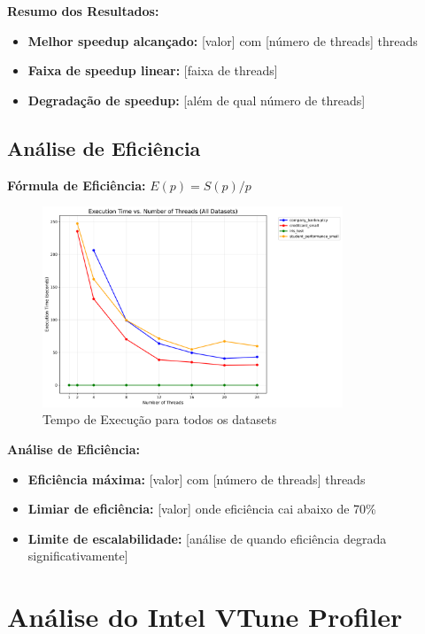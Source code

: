 \documentclass[a4paper,11pt]{article}
\begin{document}
\textbf{Resumo dos Resultados:}
\begin{itemize}
    \item \textbf{Melhor speedup alcançado:} [valor] com [número de threads] threads
    \item \textbf{Faixa de speedup linear:} [faixa de threads]
    \item \textbf{Degradação de speedup:} [além de qual número de threads]
\end{itemize}

\subsection{Análise de Eficiência}

\textbf{Fórmula de Eficiência:} $E(p) = S(p) / p$

\begin{figure}[H]
    \centering
    \includegraphics[width=0.8\textwidth]{../../results/graphs/all_datasets_execution_time.png}
    \caption{Tempo de Execução para todos os datasets}
\end{figure}

\textbf{Análise de Eficiência:}
\begin{itemize}
    \item \textbf{Eficiência máxima:} [valor] com [número de threads] threads
    \item \textbf{Limiar de eficiência:} [valor] onde eficiência cai abaixo de 70\%
    \item \textbf{Limite de escalabilidade:} [análise de quando eficiência degrada significativamente]
\end{itemize}

\section{Análise do Intel VTune Profiler}
\end{document}
